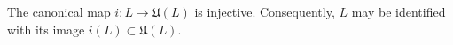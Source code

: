 The canonical map $i: L \to \mathfrak{U}(L)$ is injective. Consequently, $L$ may be identified with its image $i(L) \subset \mathfrak{U}(L)$.
